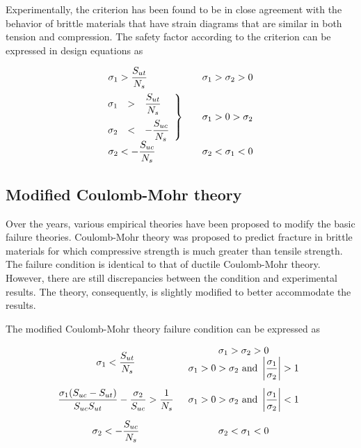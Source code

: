 \documentclass[
10pt,
a4paper,
openany,
svgnames,
]{book}
\begin{document}
Experimentally, the criterion has been found to be in close agreement with the behavior of brittle materials that have strain diagrams that are similar in both tension and compression. The safety factor according to the criterion can be expressed in design equations as

\begin{equation}
  \begin{array}{l l l}
  \sigma_1 > \dfrac{S_{ut}}{N_s} & & \sigma_1 > \sigma_2 > 0 \\[10pt]
  \left. \hspace{-0.23cm}
  \begin{array}{l l l}
    \sigma_1 & > & \dfrac{S_{ut}}{N_s} \\[10pt]
    \sigma_2 & < & -\dfrac{S_{uc}}{N_s}
    \end{array} \right\} & & \sigma_1 > 0 > \sigma_2 \\[10pt]
    \sigma_2 <  - \dfrac{S_{uc}}{N_s} & & \sigma _2 < \sigma _1 < 0
  \end{array}
  \label{eqn: MNST design eq}
\end{equation}

\subsection{Modified Coulomb-Mohr theory}

Over the years, various empirical theories have been proposed to modify the basic failure theories. Coulomb-Mohr theory was proposed to predict fracture in brittle materials for which compressive strength is much greater than tensile strength. The failure condition is identical to that of ductile Coulomb-Mohr theory. However, there are still discrepancies between the condition and experimental results. The theory, consequently, is slightly modified to better accommodate the results.

The modified Coulomb-Mohr theory failure condition can be expressed as

\begin{equation}
  \begin{array}{c c}
    \sigma_1 < \dfrac{S_{ut}}{N_s} &
      \begin{array}{c}
        \sigma_1 > \sigma_2 > 0 \\ 
        \sigma_1 > 0 > \sigma_2 \text{ and } \left| \dfrac{\sigma_1}{\sigma_2} \right| > 1 
      \end{array} \\[20pt]
    \dfrac{\sigma_1(S_{uc} - S_{ut})}{S_{uc}S_{ut}} - \dfrac{\sigma_2}{S_{uc}} >
      \dfrac{1}{N_s} & \sigma_1 > 0 > \sigma_2\text{ and }\left| \dfrac{\sigma_1}{\sigma_2} \right| < 1 \\[15pt]
    \sigma_2 <  -\dfrac{S_{uc}}{N_s} & \sigma_2 < \sigma_1 < 0 
  \end{array}
\end{equation} 
\end{document}
